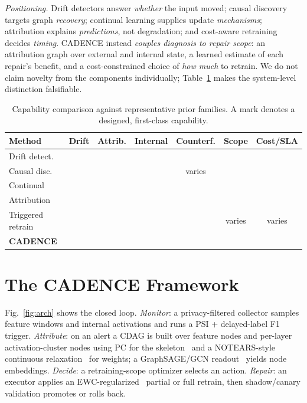\documentclass[conference]{IEEEtran}
\newcommand{\yes}{\ding{51}}
\newcommand{\no}{\textcolor{gray}{\ding{55}}}
\begin{document}
\emph{Positioning.} Drift detectors answer \emph{whether} the input moved;
causal discovery targets graph \emph{recovery}; continual learning supplies
update \emph{mechanisms}; attribution explains \emph{predictions}, not
degradation; and cost-aware retraining decides \emph{timing}. CADENCE instead
\emph{couples diagnosis to repair scope}: an attribution graph over external and
internal state, a learned estimate of each repair's benefit, and a
cost-constrained choice of \emph{how much} to retrain. We do not claim novelty
from the components individually; Table~\ref{tab:matrix} makes the system-level
distinction falsifiable.

\begin{table}[t]
\centering\footnotesize
\caption{Capability comparison against representative prior families. A mark
denotes a designed, first-class capability.}
\label{tab:matrix}
\setlength{\tabcolsep}{3.5pt}
\begin{tabular}{@{}lcccccc@{}}
\toprule
\textbf{Method} & \textbf{Drift} & \textbf{Attrib.} & \textbf{Internal} & \textbf{Counterf.} & \textbf{Scope} & \textbf{Cost/SLA}\\
\midrule
Drift detect.~\cite{gama2004,rabanser2019} & \yes & \no & \no & \no & \no & \no\\
Causal disc.~\cite{spirtes2000,zheng2018} & \no & \yes & \no & varies & \no & \no\\
Continual~\cite{kirkpatrick2017,lopezpaz2017} & \no & \no & \no & \no & \yes & \no\\
Attribution~\cite{lundberg2017} & \no & \no & \no & \no & \no & \no\\
Triggered retrain & \yes & \no & \no & \no & varies & varies\\
\textbf{CADENCE} & \yes & \yes & \yes & \yes & \yes & \yes\\
\bottomrule
\end{tabular}
\end{table}

\section{The CADENCE Framework}\label{sec:method}
Fig.~\ref{fig:arch} shows the closed loop. \emph{Monitor}: a privacy-filtered
collector samples feature windows and internal activations and runs a
PSI + delayed-label F1 trigger. \emph{Attribute}: on an alert a CDAG is built
over feature nodes and per-layer activation-cluster nodes using PC for the
skeleton~\cite{spirtes2000} and a NOTEARS-style continuous
relaxation~\cite{zheng2018} for weights; a GraphSAGE/GCN
readout~\cite{hamilton2017,kipf2017} yields node embeddings. \emph{Decide}: a
retraining-scope optimizer selects an action. \emph{Repair}: an executor applies
an EWC-regularized~\cite{kirkpatrick2017} partial or full retrain, then
shadow/canary validation promotes or rolls back.
\end{document}
